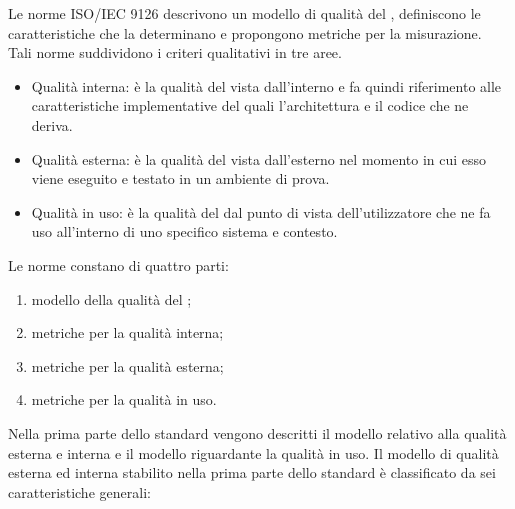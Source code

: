 	Le norme ISO/IEC 9126 descrivono un modello di qualità del , definiscono le caratteristiche che la determinano e propongono metriche per la misurazione.\\
	Tali norme suddividono i criteri qualitativi in tre aree.
	\begin{itemize}
		\item Qualità interna: è la qualità del   vista dall’interno e fa quindi riferimento alle caratteristiche implementative del  quali l’architettura e il codice che ne deriva.
		\item Qualità esterna: è la qualità del   vista dall’esterno nel momento in cui esso viene eseguito e testato in un ambiente di prova.
		\item Qualità in uso: è la qualità del   dal punto di vista dell’utilizzatore che ne fa uso all’interno di uno specifico sistema e contesto.
	\end{itemize}
	Le norme constano di quattro parti:
	\begin{enumerate}
		\item modello della qualità del ;
		\item metriche per la qualità interna;
		\item metriche per la qualità esterna;
		\item metriche per la qualità in uso.
	\end{enumerate}
		Nella prima parte dello standard vengono descritti il modello relativo alla qualità esterna e interna e il modello riguardante la qualità in uso.
			Il modello di qualità esterna ed interna stabilito nella prima parte dello standard è classificato da sei caratteristiche generali:
